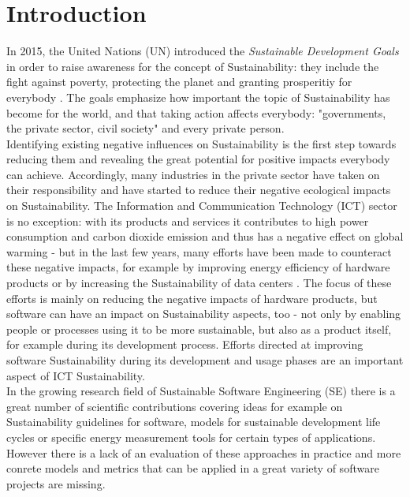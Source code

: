 \documentclass[oribibl]{llncs}
\begin{document}
\section{Introduction}
In 2015, the United Nations (UN) introduced the \textit{Sustainable Development Goals} \cite{UN_transform_15} in order to raise awareness for the concept of Sustainability: they include the fight against poverty, protecting the planet and granting prosperitiy for everybody \cite{nino_sustainable_2017}. The goals emphasize how important the topic of Sustainability has become for the world, and that taking action affects everybody: "governments, the private sector, civil society"\cite[p.\,1]{nino_sustainable_2017} and every private person.\\
Identifying existing negative influences on Sustainability is the first step towards reducing them and revealing the great potential for positive impacts  everybody can achieve. Accordingly, many industries in the private sector  have taken on their responsibility and have started to reduce their negative ecological impacts on Sustainability. The Information and Communication Technology (ICT) sector is no exception: with its products and services it contributes to high power consumption and carbon dioxide emission \cite{gartner07} and thus has a negative effect on global warming \cite{smart2020} - but in the last few years, many efforts have been made to counteract these negative impacts, for example by improving energy efficiency of hardware products or by increasing the Sustainability of data centers \cite{vor2012coolemall}. The focus of these efforts is mainly on reducing the negative impacts of hardware products, but software can have an impact on Sustainability aspects, too - not only by enabling people or processes using it to be more sustainable, but also as a product itself, for example during its development process. %
Efforts directed at improving software Sustainability during its development and usage phases are an important aspect of ICT Sustainability.\\
In the growing research field of Sustainable Software Engineering (SE) there is a great number of scientific contributions covering ideas for example on Sustainability guidelines for software, models for sustainable development life cycles or specific energy measurement tools for certain types of applications. However there is a lack of an evaluation of these approaches in practice and more conrete models and metrics that can be applied in a great variety of software projects are missing.
\end{document}
